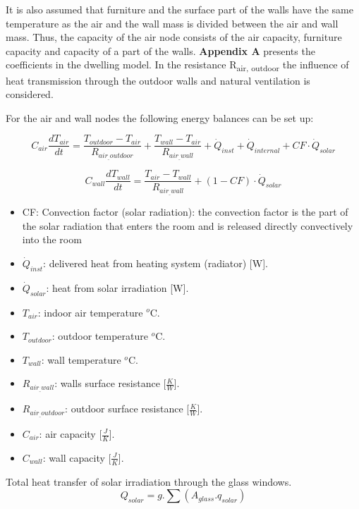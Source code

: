  It is also assumed that furniture and the surface part of the walls have the same temperature as the air and the wall mass is divided between the air and wall mass. Thus, the capacity of the air node consists of the air capacity, furniture capacity and capacity of a part of the walls. \textbf{Appendix A} presents the coefficients in the dwelling model. In the resistance R\textsubscript{air, outdoor} the influence of heat transmission through the outdoor walls and natural ventilation is considered. 
 
For the air and wall nodes the following energy balances can be set up: 

\begin{equation}
C_{air}\frac{dT_{air}}{dt}=\frac{T_{outdoor}-T_{air}}{R_{air_{\_}outdoor}} + \frac{T_{wall}-T_{air}}{R_{air_{\_}wall}} + \dot{Q}_{inst} + \dot{Q}_{internal} + CF\cdot\dot{Q}_{solar}
\end{equation}

\begin{equation}
C_{wall}\frac{dT_{wall}}{dt}=\frac{T_{air}-T_{wall}}{R_{air_{\_}wall}} + (1-CF)\cdot\dot{Q}_{solar}
\end{equation}

 \begin{itemize}
      \item CF: Convection factor (solar radiation): the convection factor is the part of the solar radiation that enters the room and is released directly convectively into the room
      \item $\dot{Q}_{inst}$: delivered heat from heating system (radiator) [W].
      \item $\dot{Q}_{solar}$: heat from solar irradiation [W].
      \item $T_{air}$: indoor air temperature $^o$C.
      \item $T_{outdoor}$: outdoor temperature $^o$C.
      \item $T_{wall}$: wall temperature $^o$C.
      \item $R_{air_{\_}wall}$: walls surface resistance [$\frac{K}{W}$].
      \item $R_{air_{\_}outdoor}$: outdoor surface resistance [$\frac{K}{W}$].
      \item $C_{air}$: air capacity [$\frac{J}{K}$].
      \item $C_{wall}$: wall capacity [$\frac{J}{K}$].
    \end{itemize}
    

Total heat transfer of solar irradiation through the glass windows. 
\begin{equation}
Q_{solar}=g.\sum(A_{glass}.q_{solar})
\end{equation}

